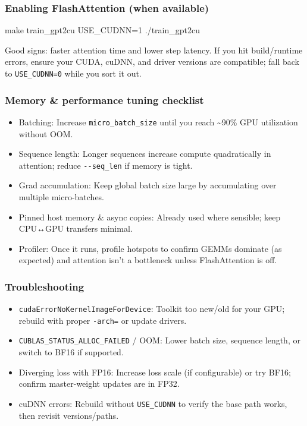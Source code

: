 \documentclass[
  letterpaper,
  DIV=11,
  numbers=noendperiod]{scrreprt}
\newenvironment{Shaded}{\begin{snugshade}}{\end{snugshade}}
\newcommand{\ExtensionTok}[1]{\textcolor[rgb]{0.00,0.23,0.31}{#1}}
\newcommand{\FunctionTok}[1]{\textcolor[rgb]{0.28,0.35,0.67}{#1}}
\newcommand{\NormalTok}[1]{\textcolor[rgb]{0.00,0.23,0.31}{#1}}
\providecommand{\tightlist}{%
  \setlength{\itemsep}{0pt}\setlength{\parskip}{0pt}}
\begin{document}
\subsubsection{Enabling FlashAttention (when
available)}\label{enabling-flashattention-when-available}

\begin{Shaded}
\begin{Highlighting}[]
\FunctionTok{make}\NormalTok{ train\_gpt2cu USE\_CUDNN=1}
\ExtensionTok{./train\_gpt2cu}
\end{Highlighting}
\end{Shaded}

Good signs: faster attention time and lower step latency. If you hit
build/runtime errors, ensure your CUDA, cuDNN, and driver versions are
compatible; fall back to \texttt{USE\_CUDNN=0} while you sort it out.

\subsubsection{Memory \& performance tuning
checklist}\label{memory-performance-tuning-checklist}

\begin{itemize}
\tightlist
\item
  Batching: Increase \texttt{micro\_batch\_size} until you reach
  \textasciitilde90\% GPU utilization without OOM.
\item
  Sequence length: Longer sequences increase compute quadratically in
  attention; reduce \texttt{-\/-seq\_len} if memory is tight.
\item
  Grad accumulation: Keep global batch size large by accumulating over
  multiple micro-batches.
\item
  Pinned host memory \& async copies: Already used where sensible; keep
  CPU↔GPU transfers minimal.
\item
  Profiler: Once it runs, profile hotspots to confirm GEMMs dominate (as
  expected) and attention isn't a bottleneck unless FlashAttention is
  off.
\end{itemize}

\subsubsection{Troubleshooting}\label{troubleshooting}

\begin{itemize}
\tightlist
\item
  \texttt{cudaErrorNoKernelImageForDevice}: Toolkit too new/old for your
  GPU; rebuild with proper \texttt{-arch=} or update drivers.
\item
  \texttt{CUBLAS\_STATUS\_ALLOC\_FAILED} / OOM: Lower batch size,
  sequence length, or switch to BF16 if supported.
\item
  Diverging loss with FP16: Increase loss scale (if configurable) or try
  BF16; confirm master-weight updates are in FP32.
\item
  cuDNN errors: Rebuild without \texttt{USE\_CUDNN} to verify the base
  path works, then revisit versions/paths.
\end{itemize}
\end{document}
